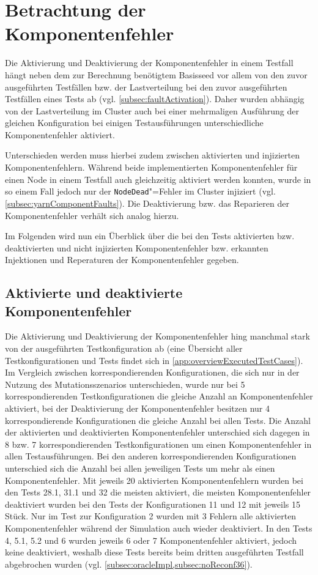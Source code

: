 \section{Betrachtung der Komponentenfehler}
\label{sec:faultEval}

Die Aktivierung und Deaktivierung der Komponentenfehler in einem Testfall hängt neben dem zur Berechnung benötigtem Basisseed vor allem von den zuvor ausgeführten Testfällen bzw. der Lastverteilung bei den zuvor ausgeführten Testfällen eines Tests ab (vgl. \cref{subsec:faultActivation}).
Daher wurden abhängig von der Lastverteilung im Cluster auch bei einer mehrmaligen Ausführung der gleichen Konfiguration bei einigen Testausführungen unterschiedliche Komponentenfehler aktiviert.

Unterschieden werden muss hierbei zudem zwischen aktivierten und injizierten Komponentenfehlern.
Während beide implementierten Komponentenfehler für einen Node in einem Testfall auch gleichzeitig aktiviert werden konnten, wurde in so einem Fall jedoch nur der \texttt{NodeDead}"=Fehler im Cluster injiziert (vgl. \cref{subsec:yarnComponentFaults}).
Die Deaktivierung bzw. das Reparieren der Komponentenfehler verhält sich analog hierzu.

Im Folgenden wird nun ein Überblick über die bei den Tests aktivierten bzw. deaktivierten und nicht injizierten Komponentenfehler bzw. erkannten Injektionen und Reperaturen der Komponentenfehler gegeben.

\subsection{Aktivierte und deaktivierte Komponentenfehler}
\label{subsec:actDeactFaults}

Die Aktivierung und Deaktivierung der Komponentenfehler hing manchmal stark von der ausgeführten Testkonfiguration ab (eine Übersicht aller Testkonfigurationen und Tests findet sich in \cref{app:overviewExecutedTestCases}).
Im Vergleich zwischen korrespondierenden Konfigurationen, die sich nur in der Nutzung des Mutationsszenarios unterschieden, wurde nur bei 5 korrespondierenden Testkonfigurationen die gleiche Anzahl an Komponentenfehler aktiviert, bei der Deaktivierung der Komponentenfehler besitzen nur 4 korrespondierende Konfigurationen die gleiche Anzahl bei allen Tests.
Die Anzahl der aktivierten und deaktivierten Komponentenfehler unterschied sich dagegen in 8 bzw. 7 korrespondierenden Testkonfigurationen um einen Komponentenfehler in allen Testausführungen.
Bei den anderen korrespondierenden Konfigurationen unterschied sich die Anzahl bei allen jeweiligen Tests um mehr als einen Komponentenfehler.
Mit jeweils 20 aktivierten Komponentenfehlern wurden bei den Tests 28.1, 31.1 und 32 die meisten aktiviert, die meisten Komponentenfehler deaktiviert wurden bei den Tests der Konfigurationen 11 und 12 mit jeweils 15 Stück.
Nur im Test zur Konfiguration 2 wurden mit 3 Fehlern alle aktivierten Komponentenfehler während der Simulation auch wieder deaktiviert.
In den Tests 4, 5.1, 5.2 und 6 wurden jeweils 6 oder 7 Komponentenfehler aktiviert, jedoch keine deaktiviert, weshalb diese Tests bereits beim dritten ausgeführten Testfall abgebrochen wurden (vgl. \cref{subsec:oracleImpl,subsec:noReconf36}).

